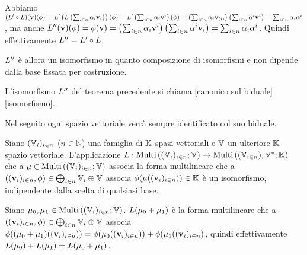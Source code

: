 \par Abbiamo
$(L' \circ L)(\mathbf{v})(\phi) =
L' \left ( L \left ( \sum_{i \in n} \alpha_i \mathbf{v}_i \right ) \right )(\phi) =
L' \left ( \sum_{i \in n} \alpha_i \mathbf{v}^i \right )(\phi) =
\left ( \sum_{i \in n} \alpha_i \mathbf{v}_{(i)} \right ) \left ( \sum_{i \in n} \alpha^i \mathbf{v}^i \right ) =
\sum_{i \in n} \alpha_i \alpha^i$,
ma anche
$L''(\mathbf{v})(\phi) =
\phi(\mathbf{v}) =
\left ( \sum_{i \in n} \alpha_i \mathbf{v}^i \right ) \left ( \sum_{i \in n} \alpha^i \mathbf{v}_i \right ) =
\sum_{i \in n} \alpha_i \alpha^i$.
Quindi effettivamente $L'' = L ' \circ L$.
\par $L''$ \`e allora un isomorfismo in quanto composizione di isomorfismi e non dipende dalla base fissata per costruzione. \EndProof
\begin{Definition}
	L'isomorfismo $L''$ del teorema precedente si chiama
	[canonico sul biduale][isomorfismo].
\end{Definition}
\par Nel seguito ogni spazio vettoriale verr\`a sempre identificato col suo biduale.
\begin{Theorem}
	Siano $(\mathbb{V}_i)_{i \in n}$ ($n \in \mathbb{N}$) una famiglia di $\mathbb{K}$-spazi vettoriali e $\mathbb{V}$ un ulteriore $\mathbb{K}$-spazio vettoriale. L'applicazione $L: \text{Multi}\left ( (\mathbb{V}_i)_{i \in n} ; \mathbb{V} \right ) \rightarrow \text{Multi}\left ( (\mathbb{V}_{i \in n}),{{\mathbb{V}}^*} ; \mathbb{K} \right )$ che a $\mu \in \text{Multi}\left ( (\mathbb{V}_i)_{i \in n} ; \mathbb{V} \right )$ associa la forma multilineare che a $((\mathbf{v}_i)_{i \in n},\phi) \in \bigoplus_{i \in n}\mathbb{V}_i \oplus \mathbb{V}$ associa $\phi(\mu((\mathbf{v}_i)_{i \in n})) \in \mathbb{K}$ \`e un isomorfismo, indipendente dalla scelta di qualsiasi base.
\end{Theorem}
\Proof Siano $\mu_0, \mu_1 \in \text{Multi}\left ( (\mathbb{V}_i)_{i \in n} ; \mathbb{V} \right )$. $L(\mu_0 + \mu_1)$ \`e la forma multilineare che a $((\mathbf{v}_i)_{i \in n}, \phi) \in \bigoplus_{i \in n} \mathbb{V}_i \oplus \mathbb{V}$ associa $\phi((\mu_0 + \mu_1)((\mathbf{v}_i)_{i \in n})) = \phi(\mu_0((\mathbf{v}_i)_{i \in n})) + \phi(\mu_1((\mathbf{v}_i)_{i \in n})$, quindi effettivamente $L(\mu_0) + L(\mu_1) = L(\mu_0 + \mu_1)$.
